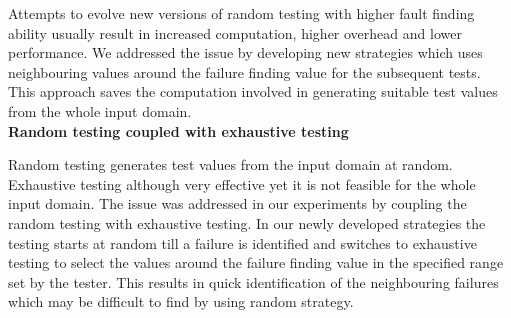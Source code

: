 Attempts to evolve new versions of random testing with higher fault finding ability usually result in increased computation, higher overhead and lower performance. We addressed the issue by developing new strategies which uses neighbouring values around the failure finding value for the subsequent tests. This approach saves the computation involved in generating suitable test values from the whole input domain. \\


\textbf{Random testing coupled with exhaustive testing}

Random testing generates test values from the input domain at random. Exhaustive testing although very effective yet it is not feasible for the whole input domain. The issue was addressed in our experiments by coupling the random testing with exhaustive testing. In our newly developed strategies the testing starts at random till a failure is identified and switches to exhaustive testing to select the values around the failure finding value in the specified range set by the tester. This results in quick identification of the neighbouring failures which may be difficult to find by using random strategy.\\








